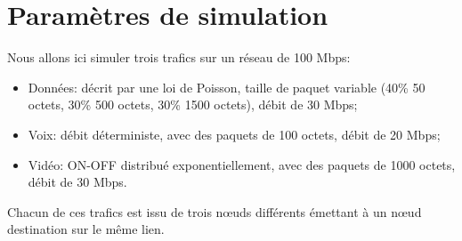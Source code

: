 \section{Paramètres de simulation}

Nous allons ici simuler trois trafics sur un réseau de 100 Mbps:

\begin{itemize}
 \item Données: décrit par une loi de Poisson, taille de paquet variable (40\% 50 octets, 30\% 500 octets, 30\% 1500 octets), débit de 30 Mbps;
 \item Voix: débit déterministe, avec des paquets de 100 octets, débit de 20 Mbps;
 \item Vidéo: ON-OFF distribué exponentiellement, avec des paquets de 1000
	 octets, débit de 30 Mbps.
\end{itemize}

Chacun de ces trafics est issu de trois nœuds différents émettant à un nœud
destination sur le même lien.
